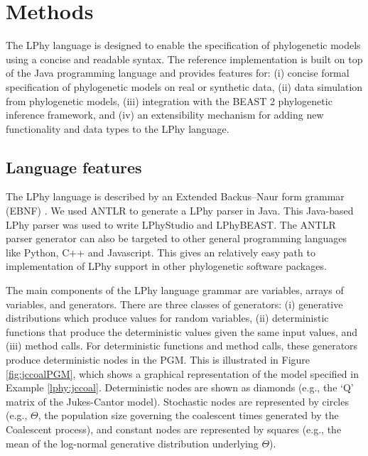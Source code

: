 \documentclass[10pt,letterpaper,table]{article}
\theoremstyle{definition}
\begin{document}
\section{Methods}
The LPhy language is designed to enable the specification of phylogenetic models using a concise and readable syntax.  
The reference implementation is built on top of the Java programming language and provides features for: 
(i) concise formal specification of phylogenetic models on real or synthetic data, (ii) data simulation from phylogenetic models, (iii) integration with the BEAST 2 phylogenetic inference framework, and (iv) an extensibility mechanism for adding new functionality and data types to the LPhy language.

\subsection{Language features}


The LPhy language is described by an Extended Backus–Naur form grammar (EBNF) \cite{ebnf}. 
We used ANTLR \cite{parr1995antlr,parr2013definitive} to generate a LPhy parser in Java. 
This Java-based LPhy parser was used to write LPhyStudio and LPhyBEAST. 
The ANTLR parser generator can also be targeted to other general programming languages like Python, C++ and Javascript. 
This gives an relatively easy path to implementation of LPhy support in other phylogenetic software packages.

The main components of the LPhy language grammar are variables, arrays of variables, and generators. 
There are three classes of generators: (i) generative distributions which produce values for random variables, (ii) deterministic functions that produce the deterministic values given the same input values, and (iii) method calls.
For deterministic functions and method calls, these generators produce deterministic nodes in the PGM.
This is illustrated in Figure \ref{fig:jccoalPGM}, which shows a graphical representation of the model specified in Example \ref{lphy:jccoal}.
Deterministic nodes are shown as diamonds (e.g., the `Q' matrix of the Jukes-Cantor model).
Stochastic nodes are represented by circles (e.g., $\Theta$, the population size governing the coalescent times generated by the Coalescent process), and constant nodes are represented by squares (e.g., the mean of the log-normal generative distribution underlying $\Theta$). 
\end{document}
